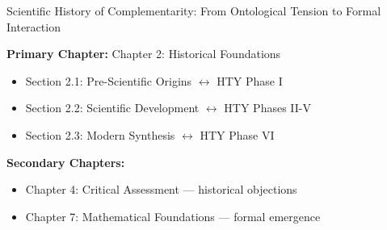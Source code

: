 \begin{chapter}{Scientific History of Complementarity: From Ontological Tension to Formal Interaction}
\begin{tcolorbox}[colback=purple!5!white, colframe=purple!75!black,
    title=Chapter Linkage]

\textbf{Primary Chapter:} Chapter 2: Historical Foundations
\begin{itemize}[nosep]
\item Section 2.1: Pre-Scientific Origins $\leftrightarrow$ HTY Phase I
\item Section 2.2: Scientific Development $\leftrightarrow$ HTY Phases II-V
\item Section 2.3: Modern Synthesis $\leftrightarrow$ HTY Phase VI
\end{itemize}

\textbf{Secondary Chapters:}
\begin{itemize}[nosep]
\item Chapter 4: Critical Assessment --- historical objections
\item Chapter 7: Mathematical Foundations --- formal emergence
\end{itemize}

\end{tcolorbox}

\begin{abstract}
This appendix provides a rigorous scientific history of complementarity---tracing its evolution from pre-scientific ontological intuitions through classical marginalization, quantum-mechanical epistemology, systems-theoretic implicitness, disciplinary fragmentation, to contemporary formal unification. We identify five critical phases: (I) ontological foundations, (II) reductionist suppression, (III) Bohrian epistemological articulation, (IV) systems-theoretic latency, and (V) formal island emergence. The analysis reveals why complementarity remained scientifically underdeveloped despite intuitive plausibility, and why the current moment---characterized by computational power, network theory, and cross-disciplinary data---enables the first unified theory of complementarity ($\gamma$). This historical reconstruction positions the EBF framework as the culmination of a 2,500-year intellectual trajectory.
\end{abstract}


\end{chapter}
